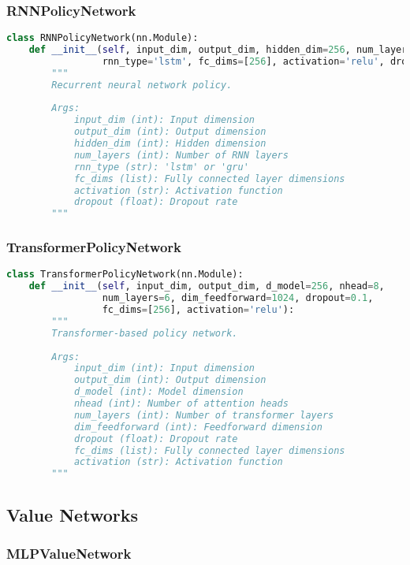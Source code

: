 \subsubsection{RNNPolicyNetwork}

\begin{lstlisting}[language=python]
class RNNPolicyNetwork(nn.Module):
    def __init__(self, input_dim, output_dim, hidden_dim=256, num_layers=2,
                 rnn_type='lstm', fc_dims=[256], activation='relu', dropout=0.1):
        """
        Recurrent neural network policy.
        
        Args:
            input_dim (int): Input dimension
            output_dim (int): Output dimension
            hidden_dim (int): Hidden dimension
            num_layers (int): Number of RNN layers
            rnn_type (str): 'lstm' or 'gru'
            fc_dims (list): Fully connected layer dimensions
            activation (str): Activation function
            dropout (float): Dropout rate
        """
\end{lstlisting}

\subsubsection{TransformerPolicyNetwork}

\begin{lstlisting}[language=python]
class TransformerPolicyNetwork(nn.Module):
    def __init__(self, input_dim, output_dim, d_model=256, nhead=8, 
                 num_layers=6, dim_feedforward=1024, dropout=0.1,
                 fc_dims=[256], activation='relu'):
        """
        Transformer-based policy network.
        
        Args:
            input_dim (int): Input dimension
            output_dim (int): Output dimension
            d_model (int): Model dimension
            nhead (int): Number of attention heads
            num_layers (int): Number of transformer layers
            dim_feedforward (int): Feedforward dimension
            dropout (float): Dropout rate
            fc_dims (list): Fully connected layer dimensions
            activation (str): Activation function
        """
\end{lstlisting}

\subsection{Value Networks}

\subsubsection{MLPValueNetwork}

